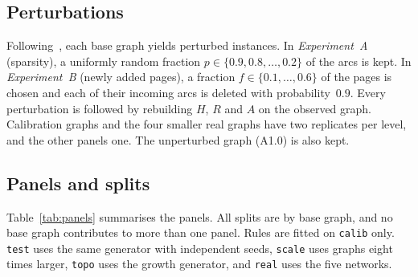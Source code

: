 \documentclass[11pt,a4paper]{article}
\theoremstyle{definition}
\theoremstyle{remark}
\begin{document}


\subsection{Perturbations}
\label{sec:perturb}
Following~\cite[§4.2]{ng13}, each base graph yields perturbed instances. In \emph{Experiment~A}
(sparsity), a uniformly random fraction $p\in\{0.9,0.8,\dots,0.2\}$ of the arcs is kept. In
\emph{Experiment~B} (newly added pages), a fraction $f\in\{0.1,\dots,0.6\}$ of the pages is chosen and
each of their incoming arcs is deleted with probability~$0.9$. Every perturbation is followed by
rebuilding $H$, $R$ and $A$ on the observed graph. Calibration graphs and the four smaller real graphs
have two replicates per level, and the other panels one. The unperturbed graph (A1.0) is also kept.

\subsection{Panels and splits}
Table~\ref{tab:panels} summarises the panels. All splits are by base graph, and no base graph
contributes to more than one panel. Rules are fitted on \texttt{calib} only. \texttt{test} uses the
same generator with independent seeds, \texttt{scale} uses graphs eight times larger, \texttt{topo} uses
the growth generator, and \texttt{real} uses the five networks.


\end{document}
